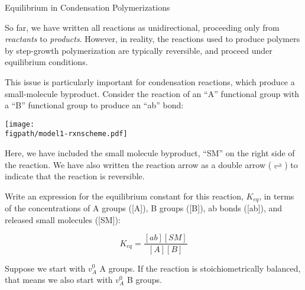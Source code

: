 \begin{activity}{Equilibrium in Condensation Polymerizations}
\begin{instructornotes}
\end{instructornotes}


\begin{model}

	So far, we have written all reactions as unidirectional, proceeding only from \emph{reactants} to \emph{products}.
	However, in reality, the reactions used to produce polymers by step-growth polymerization are typically reversible, and proceed under equilibrium conditions.
	
	This issue is particularly important for condensation reactions, which produce a small-molecule byproduct.
	Consider the reaction of an ``A'' functional group with a ``B'' functional group to produce an ``ab'' bond:
	
		\vspace{0.1in}
		\centerline{\texttt{[image: \\figpath/model1-rxnscheme.pdf]}}
	
	Here, we have included the small molecule byproduct, ``SM'' on the right side of the reaction.
	We have also written the reaction arrow as a double arrow ($\rightleftharpoons$) to indicate that the reaction is reversible.

\end{model}


\begin{ctqs}

	\question \label{\labelbase:ctq:Keq} Write an expression for the equilibrium constant for this reaction, $K_{eq}$, in terms of the concentrations of A groups ([A]), B groups ([B]), ab bonds ([ab]), and released small molecules ([SM]):
	
		\begin{solution}[1in]
			\begin{equation*}
				K_{eq} = \frac{[ab][SM]}{[A][B]}
			\end{equation*}
		\end{solution}
	
	\question \label{\labelbase:ctq:ICE} Suppose we start with $v_A^0$ A groups.  If the reaction is stoichiometrically balanced, that means we also start with $v_A^0$ B groups.
	

\end{ctqs}
\end{activity}
